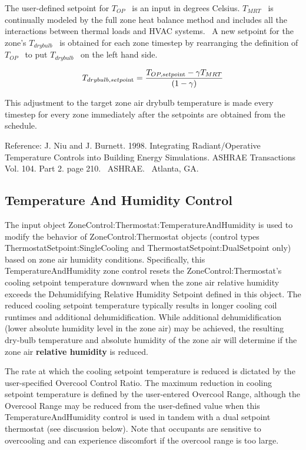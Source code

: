 The user-defined setpoint for \({T_{OP}}\) ~is an input in degrees Celsius. \({T_{MRT}}\) ~is continually modeled by the full zone heat balance method and includes all the interactions between thermal loads and HVAC systems.~ A new setpoint for the zone's \({T_{drybulb}}\) ~is obtained for each zone timestep by rearranging the definition of \({T_{OP}}\) ~to put \({T_{drybulb}}\) ~on the left hand side.

\begin{equation}
{T_{drybulb,setpo{\mathop{\rm int}} }} = \frac{{{T_{OP,setpo{\mathop{\rm int}} }} - \gamma {T_{MRT}}}}{{(1 - \gamma )}}
\end{equation}

This adjustment to the target zone air drybulb temperature is made every timestep for every zone immediately after the setpoints are obtained from the schedule.

Reference: J. Niu and J. Burnett. 1998. Integrating Radiant/Operative Temperature Controls into Building Energy Simulations. ASHRAE Transactions Vol. 104. Part 2. page 210.~ ASHRAE.~ Atlanta, GA.

\subsection{Temperature And Humidity Control}\label{temperature-and-humidity-control}

The input object ZoneControl:Thermostat:TemperatureAndHumidity is used to modify the behavior of ZoneControl:Thermostat objects (control types ThermostatSetpoint:SingleCooling and ThermostatSetpoint:DualSetpoint only) based on zone air humidity conditions. Specifically, this TemperatureAndHumidity zone control resets the ZoneControl:Thermostat's cooling setpoint temperature downward when the zone air relative humidity exceeds the Dehumidifying Relative Humidity Setpoint defined in this object. The reduced cooling setpoint temperature typically results in longer cooling coil runtimes and additional dehumidification. While additional dehumidification (lower absolute humidity level in the zone air) may be achieved, the resulting dry-bulb temperature and absolute humidity of the zone air will determine if the zone air \textbf{relative humidity} is reduced.

The rate at which the cooling setpoint temperature is reduced is dictated by the user-specified Overcool Control Ratio. The maximum reduction in cooling setpoint temperature is defined by the user-entered Overcool Range, although the Overcool Range may be reduced from the user-defined value when this TemperatureAndHumidity control is used in tandem with a dual setpoint thermostat (see discussion below). Note that occupants are sensitive to overcooling and can experience discomfort if the overcool range is too large.

